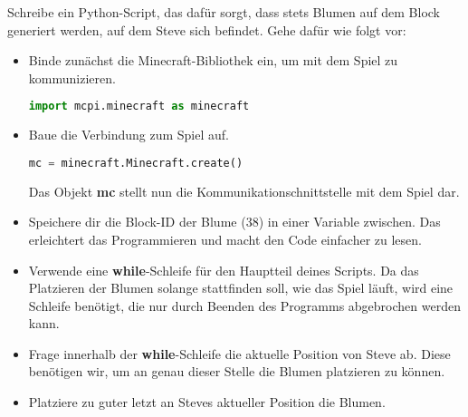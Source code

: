 \large Schreibe ein Python-Script, das dafür sorgt, dass stets Blumen auf dem Block generiert werden, auf dem Steve sich befindet.
Gehe dafür wie folgt vor:
\begin{itemize}
	\item Binde zunächst die Minecraft-Bibliothek ein, um mit dem Spiel zu kommunizieren.
	\begin{lstlisting}[language=Python]
import mcpi.minecraft as minecraft
	\end{lstlisting}
	
	\item Baue die Verbindung zum Spiel auf.
	\begin{lstlisting}[language=Python]
mc = minecraft.Minecraft.create()
	\end{lstlisting}
	Das Objekt \textbf{mc} stellt nun die Kommunikationschnittstelle mit dem Spiel dar.
	
	\item Speichere dir die Block-ID der Blume (38) in einer Variable zwischen. Das erleichtert das Programmieren und macht den Code einfacher zu lesen.
	
	\item Verwende eine \textbf{while}-Schleife für den Hauptteil deines Scripts. Da das Platzieren der Blumen solange stattfinden soll, wie das Spiel läuft, wird eine Schleife benötigt, die nur durch Beenden des Programms abgebrochen werden kann.
	
	\item Frage innerhalb der \textbf{while}-Schleife die aktuelle Position von Steve ab. Diese benötigen wir, um an genau dieser Stelle die Blumen platzieren zu können.
	
	\item Platziere zu guter letzt an Steves aktueller Position die Blumen. 
\end{itemize}